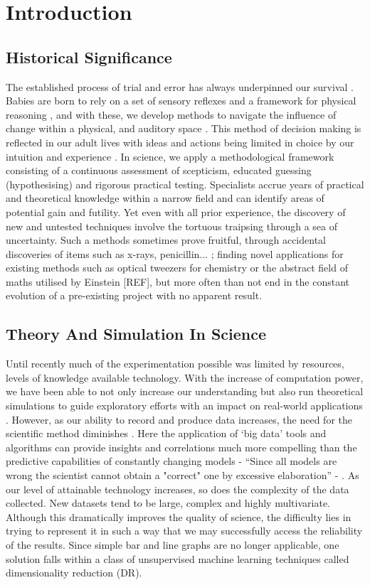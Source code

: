     
\section{Introduction}

\subsection*{Historical Significance}
The established process of trial and error has always underpinned our survival \citep{TrialandError}. Babies are born to rely on a set of sensory reflexes and a framework for physical reasoning \citep{pr}, and with these, we develop methods to navigate the influence of change within a physical, and auditory space \citep{objects}. This method of decision making is reflected in our adult lives with ideas and actions being limited in choice by our intuition and experience \citep{descartes}. In science, we apply a methodological framework consisting of a continuous assessment of scepticism, educated guessing (hypothesising) and rigorous practical testing. Specialists accrue years of practical and theoretical knowledge within a narrow field and can identify areas of potential gain and futility. Yet even with all prior experience, the discovery of new and untested techniques involve the tortuous traipsing through a sea of uncertainty. Such a methods sometimes prove fruitful, through accidental discoveries of items such as x-rays, penicillin... \citep{accidental}; finding novel applications for existing methods such as optical tweezers for chemistry or the abstract field of maths utilised by Einstein [REF], but more often than not end in the constant evolution of a pre-existing project with no apparent result.

\subsection*{Theory And Simulation In Science}

Until recently much of the experimentation possible was limited by resources, levels of knowledge available technology. With the increase of computation power, we have been able to not only increase our understanding but also run theoretical simulations to guide exploratory efforts with an impact on real-world applications \citep{dft,lion,theoreticalbio,drug}. However, as our ability to record and produce data increases, the need for the scientific method diminishes \citep{wired}. Here the application of `big data' tools and algorithms can provide insights and correlations much more compelling than the predictive capabilities of constantly changing models - ``Since all models are wrong the scientist cannot obtain
a "correct" one by excessive elaboration'' - \cite{allmodels}. As our level of attainable technology increases, so does the complexity of the data collected. New datasets tend to be large, complex and highly multivariate. Although this dramatically improves the quality of science, the difficulty lies in trying to represent it in such a way that we may successfully access the reliability of the results. Since simple bar and line graphs are no longer applicable, one solution falls within a class of unsupervised machine learning techniques called dimensionality reduction (DR).


